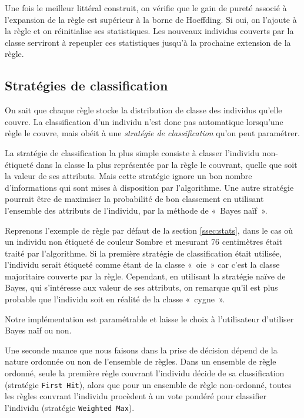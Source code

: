             Une fois le meilleur littéral construit, on vérifie que le gain de pureté associé à l'expansion de la règle est supérieur à la borne de Hoeffding. Si oui, on l’ajoute à la règle et on réinitialise ses statistiques. Les nouveaux individus couverts par la classe serviront à repeupler ces statistiques jusqu'à la prochaine extension de la règle.

        
        \subsection{Stratégies de classification}\label{ssec:nondecisional}
        
            On sait que chaque règle stocke la distribution de classe des individus qu'elle couvre. La classification d'un individu n'est donc pas automatique lorsqu'une règle le couvre, mais obéit à une \emph{stratégie de classification} qu'on peut paramétrer.

            La stratégie de classification la plus simple consiste à classer l’individu non-étiqueté dans la classe la plus représentée par la règle le couvrant, quelle que soit la valeur de ses attributs. Mais cette stratégie ignore un bon nombre d’informations qui sont mises à disposition par l’algorithme. Une autre stratégie pourrait être de maximiser la probabilité de bon classement en utilisant l’ensemble des attributs de l’individu, par la méthode de «~Bayes naïf~».\cite{Gama-VFDR}
            
            Reprenons l’exemple de règle par défaut de la section \ref{ssec:stats}, dans le cas où un individu non étiqueté de couleur Sombre et mesurant 76 centimètres était traité par l’algorithme. Si la première stratégie de classification était utilisée, l’individu serait étiqueté comme étant de la classe «~oie~» car c’est la classe majoritaire couverte par la règle. Cependant, en utilisant la stratégie naïve de Bayes, qui s'intéresse aux valeur de ses attributs, on remarque qu’il est plus probable que l’individu soit en réalité de la classe «~cygne~». 

            Notre implémentation est paramétrable et laisse le choix à l'utilisateur d'utiliser Bayes naïf ou non.

            Une seconde nuance que nous faisons dans la prise de décision dépend de la nature ordonnée ou non de l'ensemble de règles. Dans un ensemble de règle ordonné, seule la première règle couvrant l’individu décide de sa classification (stratégie \texttt{First Hit}), alors que pour un ensemble de règle non-ordonné, toutes les règles couvrant l’individu procèdent à un vote pondéré pour classifier l’individu (stratégie \texttt{Weighted Max}).





